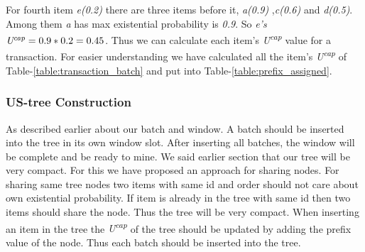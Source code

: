 \documentclass[conference]{IEEEtran}
\begin{document}
For fourth item \emph{e(0.2)} there are three items before it, \emph{a(0.9)} ,\emph{c(0.6)} and \emph{d(0.5)}. Among them \emph{a} has max existential probability is \emph{0.9}. So \emph{e's}  $\emph{U\textsuperscript{cap}} = 0.9*0.2 = 0.45$. Thus we can calculate each item's \emph{U\textsuperscript{cap}} value for a transaction. For easier understanding we have calculated all the item's \emph{U\textsuperscript{cap}} of Table-\ref{table:transaction_batch} and put into Table-\ref{table:prefix_assigned}.

\subsubsection{US-tree Construction}
As described earlier about our batch and window. A batch should be inserted into the tree in its own window slot. After inserting all batches, the window will be complete and be ready to mine. We said earlier section that our tree will be very compact. For this we have proposed an approach for sharing nodes. For sharing same tree nodes two items with same id and order should not care about own existential probability. If item is already in the tree with same id then two items should share the node. Thus the tree will be very compact. When inserting an item in the tree the \emph{U\textsuperscript{cap}} of the tree should be updated by adding the prefix value of the node. Thus each batch should be inserted into the tree.
    
\end{document}
